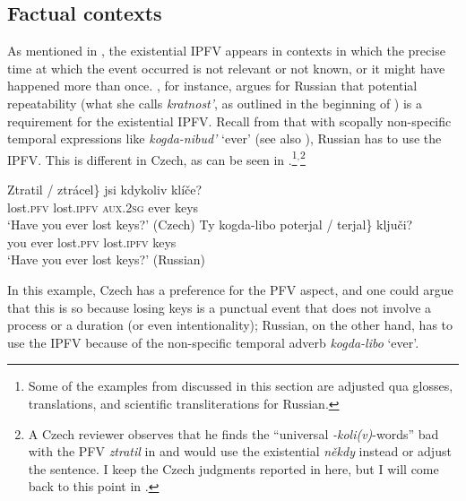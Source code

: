 \documentclass[output=paper,colorlinks,citecolor=brown]{langscibook}
\begin{document}
\subsection{Factual contexts}
\label{sec:OFCZRU}

As mentioned in , the existential IPFV appears in contexts in which the precise time at which the event occurred is not relevant or not known, or it might have happened more than once. \citet{paduceva96}, for instance, argues for Russian that potential repeatability (what she calls \textit{kratnost'}, as outlined in the beginning of ) is a requirement for the existential IPFV. Recall from  that with scopally non-specific temporal expressions like \textit{kogda-nibud'} `ever' (see also ), Russian has to use the IPFV. This is different in Czech, as can be seen in  \citep[adapted from][10]{klimek22} \citep[see also discussion in][]{Dickey2000,gehrke02,gehrke22,Mueller-Reichau2018a}.\footnote{Some of the examples from \citet{klimek22} discussed in this section are adjusted qua glosses, translations, and scientific transliterations for Russian.}$^,$\footnote{\label{fn:kogdadoubt}A Czech reviewer observes that he finds the ``universal \textit{-koli(v)}-words'' bad with the PFV \textit{ztratil} in  and would use the existential \textit{někdy} instead or adjust the sentence. I keep the Czech judgments reported in \citet{klimek22} here, but I will come back to this point in .}

\ea\label{ex:kogda}
\ea 
\gll \minsp{\{} Ztratil /  ztrácel\} jsi kdykoliv klíče?\\
    {} lost.\textsc{pfv} {} {} lost.\textsc{ipfv} \textsc{aux.2sg} ever keys\\
\glt `Have you ever lost keys?' \hfill (Czech)
\ex
\gll Ty kogda-libo \minsp{\{*} poterjal / terjal\} ključi?\\
    you ever {} lost.\textsc{pfv} {} lost.\textsc{ipfv} keys\\
\glt    `Have you ever lost keys?' \hfill (Russian)
\z 
\z 

\noindent In this example, Czech has a preference for the PFV aspect, and one could argue that this is so because losing keys is a punctual event that does not involve a process or a duration (or even intentionality); Russian, on the other hand, has to use the IPFV because of the non-specific temporal adverb \textit{kogda-libo} `ever'. 
\end{document}
